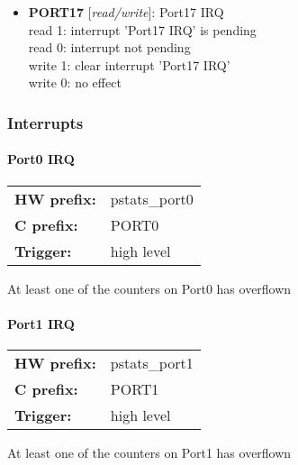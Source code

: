 \begin{itemize}
\begin{small}
{\bf 
PORT16
} [\emph{read/write}]: Port16 IRQ
\\
read 1: interrupt 'Port16 IRQ' is pending\\read 0: interrupt not pending\\write 1: clear interrupt 'Port16 IRQ'\\write 0: no effect
\end{small}
\item \begin{small}
{\bf 
PORT17
} [\emph{read/write}]: Port17 IRQ
\\
read 1: interrupt 'Port17 IRQ' is pending\\read 0: interrupt not pending\\write 1: clear interrupt 'Port17 IRQ'\\write 0: no effect
\end{small}
\end{itemize}


\subsubsection{Interrupts}
\paragraph*{Port0 IRQ}\vspace{12pt}
\begin{small}
\begin{tabular}{l l }
{\bf HW prefix:}  & pstats\_port0\\
{\bf C prefix:}  & PORT0\\
{\bf Trigger:}  & high level\\
\end{tabular}

\end{small}
\vspace{12pt}
At least one of the counters on Port0 has overflown
\paragraph*{Port1 IRQ}\vspace{12pt}
\begin{small}
\begin{tabular}{l l }
{\bf HW prefix:}  & pstats\_port1\\
{\bf C prefix:}  & PORT1\\
{\bf Trigger:}  & high level\\
\end{tabular}

\end{small}
\vspace{12pt}
At least one of the counters on Port1 has overflown
